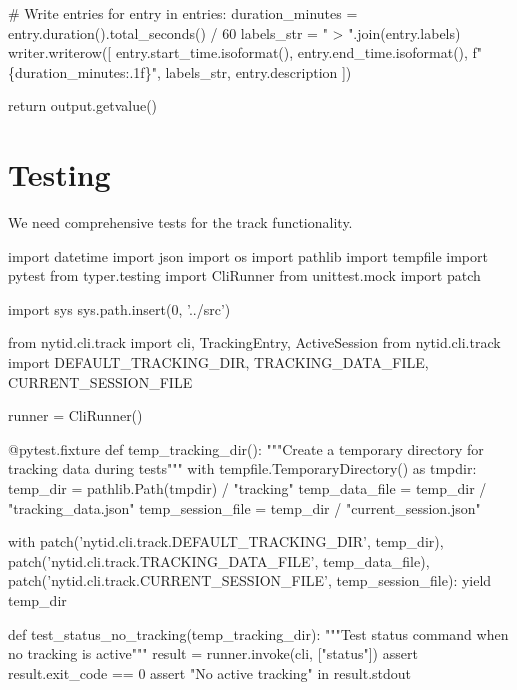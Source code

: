     # Write entries
    for entry in entries:
        duration_minutes = entry.duration().total_seconds() / 60
        labels_str = " > ".join(entry.labels)
        writer.writerow([
            entry.start_time.isoformat(),
            entry.end_time.isoformat(),
            f"\{duration_minutes:.1f\}",
            labels_str,
            entry.description
        ])
    
    return output.getvalue()
\nwendcode{}\nwdocspar

\section{Testing}

We need comprehensive tests for the track functionality.

\nwenddocs{}\endmoddef\nwstartdeflinemarkup\nwenddeflinemarkup
import datetime
import json
import os
import pathlib
import tempfile
import pytest
from typer.testing import CliRunner
from unittest.mock import patch

import sys
sys.path.insert(0, '../src')

from nytid.cli.track import cli, TrackingEntry, ActiveSession
from nytid.cli.track import DEFAULT_TRACKING_DIR, TRACKING_DATA_FILE, CURRENT_SESSION_FILE

runner = CliRunner()

@pytest.fixture
def temp_tracking_dir():
    """Create a temporary directory for tracking data during tests"""
    with tempfile.TemporaryDirectory() as tmpdir:
        temp_dir = pathlib.Path(tmpdir) / "tracking"
        temp_data_file = temp_dir / "tracking_data.json"
        temp_session_file = temp_dir / "current_session.json"
        
        with patch('nytid.cli.track.DEFAULT_TRACKING_DIR', temp_dir), \\
             patch('nytid.cli.track.TRACKING_DATA_FILE', temp_data_file), \\
             patch('nytid.cli.track.CURRENT_SESSION_FILE', temp_session_file):
            yield temp_dir

def test_status_no_tracking(temp_tracking_dir):
    """Test status command when no tracking is active"""
    result = runner.invoke(cli, ["status"])
    assert result.exit_code == 0
    assert "No active tracking" in result.stdout

